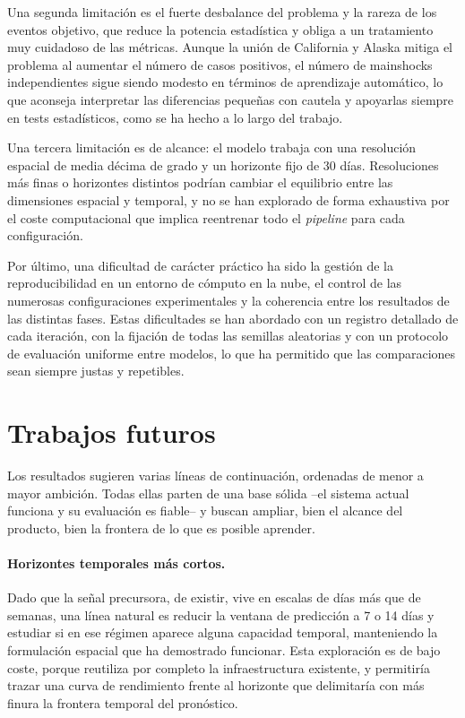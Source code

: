 Una segunda limitación es el fuerte desbalance del problema y la rareza de los eventos objetivo,
que reduce la potencia estadística y obliga a un tratamiento muy cuidadoso de las métricas.
Aunque la unión de California y Alaska mitiga el problema al aumentar el número de casos
positivos, el número de mainshocks independientes sigue siendo modesto en términos de aprendizaje
automático, lo que aconseja interpretar las diferencias pequeñas con cautela y apoyarlas siempre
en tests estadísticos, como se ha hecho a lo largo del trabajo.

Una tercera limitación es de alcance: el modelo trabaja con una resolución espacial de media
décima de grado y un horizonte fijo de 30 días. Resoluciones más finas o horizontes distintos
podrían cambiar el equilibrio entre las dimensiones espacial y temporal, y no se han explorado de
forma exhaustiva por el coste computacional que implica reentrenar todo el \textit{pipeline} para
cada configuración.

Por último, una dificultad de carácter práctico ha sido la gestión de la reproducibilidad en un
entorno de cómputo en la nube, el control de las numerosas configuraciones experimentales y la
coherencia entre los resultados de las distintas fases. Estas dificultades se han abordado con un
registro detallado de cada iteración, con la fijación de todas las semillas aleatorias y con un
protocolo de evaluación uniforme entre modelos, lo que ha permitido que las comparaciones sean
siempre justas y repetibles.

\section{Trabajos futuros}
\label{trabajos-futuros}

Los resultados sugieren varias líneas de continuación, ordenadas de menor a mayor ambición. Todas
ellas parten de una base sólida --el sistema actual funciona y su evaluación es fiable-- y buscan
ampliar, bien el alcance del producto, bien la frontera de lo que es posible aprender.

\paragraph{Horizontes temporales más cortos.} Dado que la señal precursora, de existir, vive en
escalas de días más que de semanas, una línea natural es reducir la ventana de predicción a 7 o
14 días y estudiar si en ese régimen aparece alguna capacidad temporal, manteniendo la
formulación espacial que ha demostrado funcionar. Esta exploración es de bajo coste, porque
reutiliza por completo la infraestructura existente, y permitiría trazar una curva de
rendimiento frente al horizonte que delimitaría con más finura la frontera temporal del
pronóstico.


